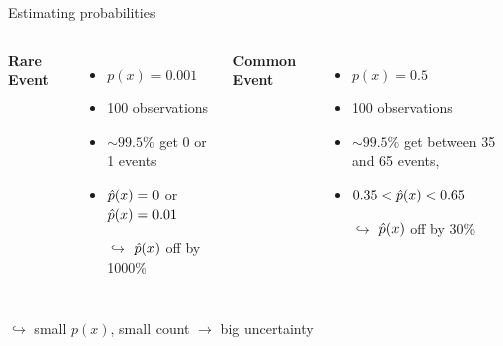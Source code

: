 \begin{frame}{Estimating probabilities}
\begin{columns}[T]
\textbf{Rare Event} %
\begin{itemize}
  \item $p(x) = 0.001$
  \item \num{100} observations
  \item $\sim 99.5\%$ get 0 or 1 events
  \item $\hat{p}(x) = 0$ or $\hat{p}(x)=0.01$
  \item[$\hookrightarrow$] $\hat{p}(x)$ off by \num{1000}\% 
\end{itemize}
\textbf{Common Event} %
\begin{itemize}
  \item $p(x)=0.5$
  \item \num{100} observations
  \item $\sim 99.5\%$ get between 35 and 65 events,
  \item $0.35< \hat{p}(x) <0.65$
  \item[$\hookrightarrow$] $\hat{p}(x)$ off by 30\%
\end{itemize}
\end{columns}
\vspace{2em}
 \centering
$\hookrightarrow$ small $p(x)$, small count $\rightarrow$ big uncertainty
\end{frame}



